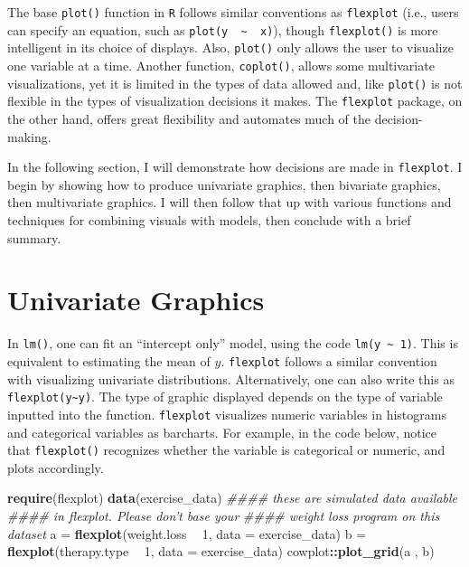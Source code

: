 \documentclass[
  doc]{apa6}
\newenvironment{Shaded}{\begin{snugshade}}{\end{snugshade}}
\newcommand{\CommentTok}[1]{\textcolor[rgb]{0.56,0.35,0.01}{\textit{#1}}}
\newcommand{\DataTypeTok}[1]{\textcolor[rgb]{0.13,0.29,0.53}{#1}}
\newcommand{\DecValTok}[1]{\textcolor[rgb]{0.00,0.00,0.81}{#1}}
\newcommand{\KeywordTok}[1]{\textcolor[rgb]{0.13,0.29,0.53}{\textbf{#1}}}
\newcommand{\NormalTok}[1]{#1}
\newcommand{\OperatorTok}[1]{\textcolor[rgb]{0.81,0.36,0.00}{\textbf{#1}}}
\newcommand{\StringTok}[1]{\textcolor[rgb]{0.31,0.60,0.02}{#1}}
\begin{document}
The base \texttt{plot()} function in \texttt{R} follows similar conventions as \texttt{flexplot} (i.e., users can specify an equation, such as \texttt{plot(y\ \ \textasciitilde{}\ \ x)}), though \texttt{flexplot()} is more intelligent in its choice of displays. Also, \texttt{plot()} only allows the user to visualize one variable at a time. Another function, \texttt{coplot()}, allows some multivariate visualizations, yet it is limited in the types of data allowed and, like \texttt{plot()} is not flexible in the types of visualization decisions it makes. The \texttt{flexplot} package, on the other hand, offers great flexibility and automates much of the decision-making.

In the following section, I will demonstrate how decisions are made in \texttt{flexplot}. I begin by showing how to produce univariate graphics, then bivariate graphics, then multivariate graphics. I will then follow that up with various functions and techniques for combining visuals with models, then conclude with a brief summary.

\hypertarget{univariate-graphics}{%
\section{Univariate Graphics}\label{univariate-graphics}}

In \texttt{lm()}, one can fit an \enquote{intercept only} model, using the code \texttt{lm(y\ \textasciitilde{}\ 1)}. This is equivalent to estimating the mean of \(y\). \texttt{flexplot} follows a similar convention with visualizing univariate distributions. Alternatively, one can also write this as \texttt{flexplot(y\textasciitilde{}y)}. The type of graphic displayed depends on the type of variable inputted into the function. \texttt{flexplot} visualizes numeric variables in histograms and categorical variables as barcharts. For example, in the code below, notice that \texttt{flexplot()} recognizes whether the variable is categorical or numeric, and plots accordingly.

\begin{Shaded}
\begin{Highlighting}[]
\KeywordTok{require}\NormalTok{(flexplot)}
\KeywordTok{data}\NormalTok{(exercise_data) }\CommentTok{#### these are simulated data available }
                    \CommentTok{#### in flexplot. Please don't base your }
                    \CommentTok{#### weight loss program on this dataset}
\NormalTok{a =}\StringTok{ }\KeywordTok{flexplot}\NormalTok{(weight.loss }\OperatorTok{~}\StringTok{ }\DecValTok{1}\NormalTok{, }\DataTypeTok{data =}\NormalTok{ exercise_data)}
\NormalTok{b =}\StringTok{ }\KeywordTok{flexplot}\NormalTok{(therapy.type }\OperatorTok{~}\StringTok{ }\DecValTok{1}\NormalTok{, }\DataTypeTok{data =}\NormalTok{ exercise_data)}
\NormalTok{cowplot}\OperatorTok{::}\KeywordTok{plot_grid}\NormalTok{(a , b)}
\end{Highlighting}
\end{Shaded}
\end{document}
